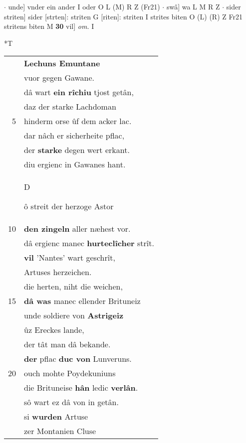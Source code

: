 \documentclass[8pt,a4paper,notitlepage]{article}
\begin{document}
\begin{table}[ht]
\begin{minipage}[t]{0.5\linewidth}
$\cdot$ unde] vnder ein ander I oder O L (M) R Z (Fr21)  $\cdot$ swâ] wa L M R Z  $\cdot$ sider striten] sider [strten]: striten G [riten]: striten I strites biten O (L) (R) Z Fr21 stritens biten M \textbf{30} vil] \textit{om.} I \newline
\end{minipage}
\hspace{0.5cm}
\begin{minipage}[t]{0.5\linewidth}
\small
\begin{center}*T
\end{center}
\begin{tabular}{rl}
 & \textbf{Lechuns Emuntane}\\ 
 & vuor gegen Gawane.\\ 
 & dâ wart \textbf{ein rîchiu} tjost getân,\\ 
 & daz der starke Lachdoman\\ 
5 & hinderm orse ûf dem acker lac.\\ 
 & dar nâch er sicherheite pflac,\\ 
 & der \textbf{starke} degen wert erkant.\\ 
 & diu ergienc in Gawanes hant.\\ 
 & \begin{large}D\end{large}ô streit der herzoge Astor\\ 
10 & \textbf{den zingeln} aller næhest vor.\\ 
 & dâ ergienc manec \textbf{hurteclîcher} strît.\\ 
 & \textbf{vil} 'Nantes' wart geschrît,\\ 
 & Artuses herzeichen.\\ 
 & die herten, niht die weichen,\\ 
15 & \textbf{dâ was} manec ellender Brituneiz\\ 
 & unde soldiere von \textbf{Astrigeiz}\\ 
 & ûz Ereckes lande,\\ 
 & der tât man dâ bekande.\\ 
 & \textbf{der} pflac \textbf{duc von} Lunveruns.\\ 
20 & ouch mohte Poydekuniuns\\ 
 & die Brituneise \textbf{hân} ledic \textbf{verlân}.\\ 
 & sô wart ez dâ von in getân.\\ 
 & si \textbf{wurden} Artuse\\ 
 & zer Montanien Cluse\\ 

\end{tabular}
\end{minipage}
\end{table}
\end{document}

